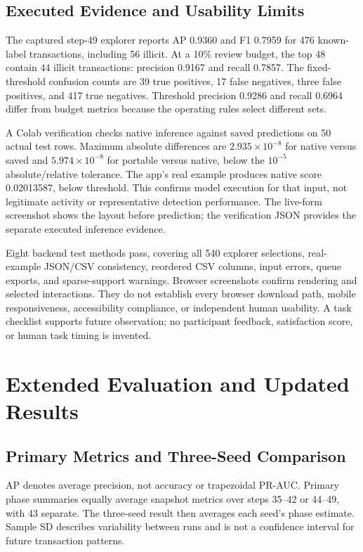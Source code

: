 \documentclass[10pt,twocolumn,letterpaper]{article}
\begin{document}
\subsection{Executed Evidence and Usability Limits}
The captured step-49 explorer reports AP 0.9360 and F1 0.7959 for 476 known-label transactions, including 56 illicit. At a 10\% review budget, the top 48 contain 44 illicit transactions: precision 0.9167 and recall 0.7857. The fixed-threshold confusion counts are 39 true positives, 17 false negatives, three false positives, and 417 true negatives. Threshold precision 0.9286 and recall 0.6964 differ from budget metrics because the operating rules select different sets.

A Colab verification checks native inference against saved predictions on 50 actual test rows. Maximum absolute differences are $2.935\times10^{-8}$ for native versus saved and $5.974\times10^{-8}$ for portable versus native, below the $10^{-5}$ absolute/relative tolerance. The app's real example produces native score 0.02013587, below threshold. This confirms model execution for that input, not legitimate activity or representative detection performance. The live-form screenshot shows the layout before prediction; the verification JSON provides the separate executed inference evidence.

Eight backend test methods pass, covering all 540 explorer selections, real-example JSON/CSV consistency, reordered CSV columns, input errors, queue exports, and sparse-support warnings. Browser screenshots confirm rendering and selected interactions. They do not establish every browser download path, mobile responsiveness, accessibility compliance, or independent human usability. A task checklist supports future observation; no participant feedback, satisfaction score, or human task timing is invented.

\section{Extended Evaluation and Updated Results}
\subsection{Primary Metrics and Three-Seed Comparison}
AP denotes average precision, not accuracy or trapezoidal PR-AUC. Primary phase summaries equally average snapshot metrics over steps 35--42 or 44--49, with 43 separate. The three-seed result then averages each seed's phase estimate. Sample SD describes variability between runs and is not a confidence interval for future transaction patterns.
\end{document}
